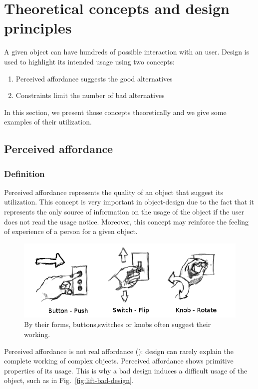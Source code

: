 \documentclass[a4paper,11pt] {article}
\theoremstyle{definition}
\begin{document}
\section{Theoretical concepts and design principles}

A given object can have hundreds of possible interaction with an user. Design is used to highlight its intended usage using two concepts:
\begin{enumerate}
\item Perceived affordance suggests the good alternatives
\item Constraints limit the number of bad alternatives
\end{enumerate}

In this section, we present those concepts theoretically and we give some examples of their utilization.

\label{sct:theory}

    \subsection{Perceived affordance}
        \subsubsection{Definition}
Perceived affordance represents the quality of an object that suggest its utilization. This concept is very important in object-design due to the fact that it represents the only source of information on the usage of the object if the user does not read the usage notice. Moreover, this concept may reinforce the feeling of experience of a person for a given object.

\begin{figure}[h]
\centering
\includegraphics[scale=0.40]{fig-report/switches-only.png}
\caption{By their forms, buttons,switches or knobs often suggest their working.}
\end{figure}

Perceived affordance is not real affordance (\cite{affordancesMads}): design can rarely explain the complete working of complex objects. Perceived affordance shows primitive properties of its usage. This is why a bad design induces a difficult usage of the object, such as in Fig.~\ref{fig:lift-bad-design}.
\end{document}
